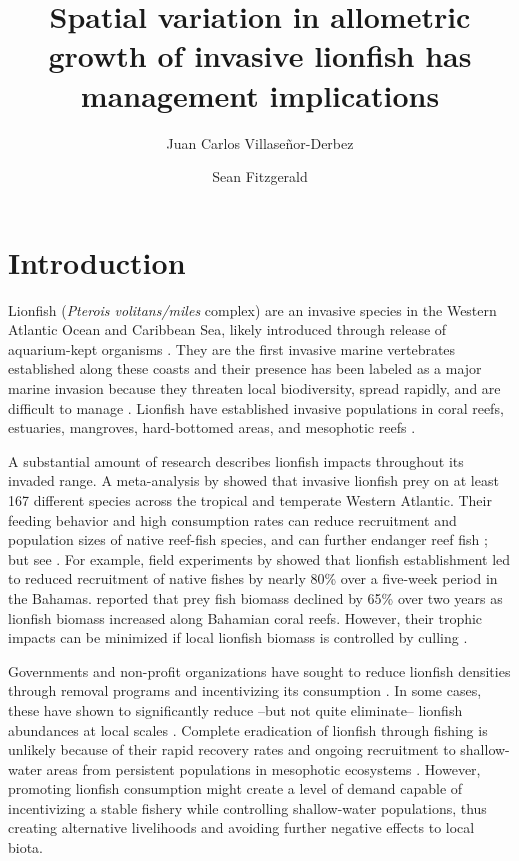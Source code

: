\documentclass[fleqn,10pt,lineno]{wlpeerj} %
\title{Spatial variation in allometric growth of invasive lionfish has
management implications}
\author[1]{Juan Carlos Villaseñor-Derbez}
\author[1]{Sean Fitzgerald}
\affil[1]{Bren School of Environmental Sciences and Management, University of California
  Santa Barbara, Santa Barbara, California, USA}
\begin{document}
\flushbottom
\maketitle
\thispagestyle{empty}

\section*{Introduction}

Lionfish (\emph{Pterois volitans/miles} complex) are an invasive species
in the Western Atlantic Ocean and Caribbean Sea, likely introduced
through release of aquarium-kept organisms \citep{betancurr_2011}. They
are the first invasive marine vertebrates established along these coasts
\citep{schofield_2009,schofield_2010,sabidoitza_2016} and their presence
has been labeled as a major marine invasion because they threaten local
biodiversity, spread rapidly, and are difficult to manage
\citep{hixon_2016}. Lionfish have established invasive populations in
coral reefs, estuaries, mangroves, hard-bottomed areas, and mesophotic
reefs
\citep{barbour_2010,jud_2011,muoz_2011,claydon_2012,andradibrown_2017,gress_2017}.

A substantial amount of research describes lionfish impacts throughout
its invaded range. A meta-analysis by \citet{peake_2018} showed that
invasive lionfish prey on at least 167 different species across the
tropical and temperate Western Atlantic. Their feeding behavior and high
consumption rates can reduce recruitment and population sizes of native
reef-fish species, and can further endanger reef fish
\citep{green_2012,rocha_2015}; but see \citet{hackerott_2017}. For
example, field experiments by \citet{albins_2008} showed that lionfish
establishment led to reduced recruitment of native fishes by nearly 80\%
over a five-week period in the Bahamas. \citet{green_2012} reported that
prey fish biomass declined by 65\% over two years as lionfish biomass
increased along Bahamian coral reefs. However, their trophic impacts can
be minimized if local lionfish biomass is controlled by culling
\citep{ariasgonzalez_2011}.

Governments and non-profit organizations have sought to reduce lionfish
densities through removal programs and incentivizing its consumption
\citep{chin_2016}. In some cases, these have shown to significantly
reduce --but not quite eliminate-- lionfish abundances at local scales
\citep{deleon_2013,sandel_2015}. Complete eradication of lionfish
through fishing is unlikely because of their rapid recovery rates and
ongoing recruitment to shallow-water areas from persistent populations
in mesophotic ecosystems \citep{barbour_2011,andradibrown_2017}.
However, promoting lionfish consumption might create a level of demand
capable of incentivizing a stable fishery while controlling
shallow-water populations, thus creating alternative livelihoods and
avoiding further negative effects to local biota.
\end{document}
